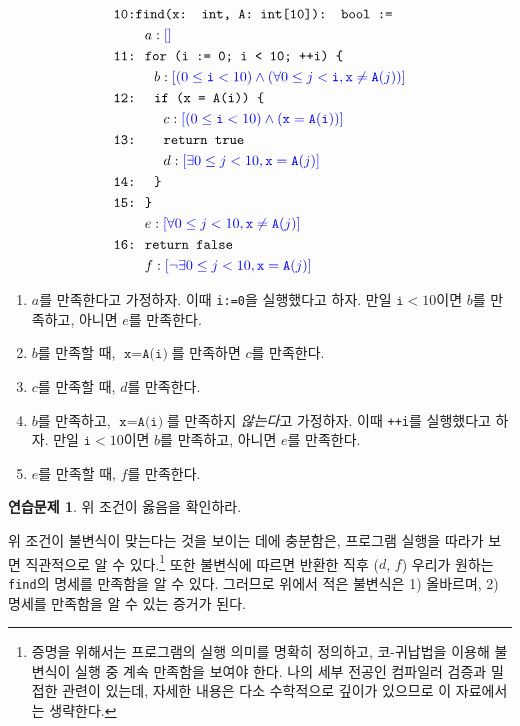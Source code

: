 \documentclass{oblivoir}
\theoremstyle{definition}
\newtheorem{exercise}{연습문제}
\newcommand{\inv}[1]{\textcolor{blue}{\ensuremath{[{#1}]}}}
\begin{document}
\begin{align*}
\texttt{10:}& \texttt{find(x: int, A: int[10]): bool :=} \\
& \ \ a: \inv{} \\
\texttt{11:}& \ \ \texttt{for (i := 0; i < 10; ++i) \{} \\
& \ \ \ \ b: \inv{(0 \leq \texttt{i} < 10) \land (\forall 0\leq j<\texttt{i}, \texttt{x} \neq \texttt{A}(j))} \\
\texttt{12:}& \ \ \ \ \texttt{if (x = A(i)) \{} \\
& \ \ \ \ \ \ c: \inv{(0 \leq \texttt{i} < 10) \land (\texttt{x} = \texttt{A}(\texttt{i}))} \\
\texttt{13:}& \ \ \ \ \ \ \texttt{return true} \\
& \ \ \ \ \ \ d: \inv{\exists 0\leq j<10, \texttt{x} = \texttt{A}(j)} \\
\texttt{14:}& \ \ \ \ \texttt{\}} \\
\texttt{15:}& \ \ \texttt{\}} \\
& \ \ e: \inv{\forall 0\leq j<10, \texttt{x} \neq \texttt{A}(j)} \\
\texttt{16:}& \ \ \texttt{return false} \\
& \ \ f: \inv{\neg \exists 0\leq j<10, \texttt{x} = \texttt{A}(j)}
\end{align*}

\begin{enumerate}
\item $a$를 만족한다고 가정하자.  이때 \texttt{i:=0}을 실행했다고
  하자.  만일 $\texttt{i}<10$이면 $b$를 만족하고, 아니면 $e$를
  만족한다.
\item $b$를 만족할 때, $\texttt{x}=\texttt{A(i)}$를 만족하면 $c$를
  만족한다.
\item $c$를 만족할 때, $d$를 만족한다.
\item $b$를 만족하고, $\texttt{x}=\texttt{A(i)}$를 만족하지
  \emph{않는다}고 가정하자.  이때 \texttt{++i}를 실행했다고 하자.  만일
  $\texttt{i}<10$이면 $b$를 만족하고, 아니면 $e$를 만족한다.
\item $e$를 만족할 때, $f$를 만족한다.
\end{enumerate}

\begin{exercise}
  위 조건이 옳음을 확인하라.
\end{exercise}

위 조건이 불변식이 맞는다는 것을 보이는 데에 충분함은, 프로그램 실행을
따라가 보면 직관적으로 알 수 있다.\footnote{증명을 위해서는 프로그램의
  실행 의미를 명확히 정의하고, 코-귀납법을 이용해 불변식이 실행 중 계속
  만족함을 보여야 한다.  나의 세부 전공인 컴파일러 검증과 밀접한 관련이
  있는데, 자세한 내용은 다소 수학적으로 깊이가 있으므로 이 자료에서는
  생략한다.}  또한 불변식에 따르면 반환한 직후 ($d$, $f$) 우리가 원하는
\texttt{find}의 명세를 만족함을 알 수 있다.  그러므로 위에서 적은
불변식은 1) 올바르며, 2) 명세를 만족함을 알 수 있는 증거가 된다.
\end{document}
